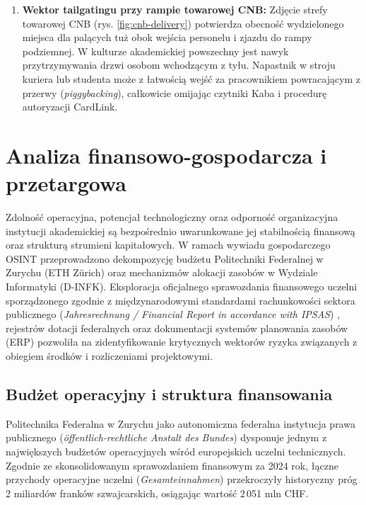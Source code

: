 \begin{enumerate}
    \item \textbf{Wektor tailgatingu przy rampie towarowej CNB:} Zdjęcie strefy towarowej CNB (rys. \ref{fig:cnb-delivery}) potwierdza obecność wydzielonego miejsca dla palących tuż obok wejścia personelu i zjazdu do rampy podziemnej. W kulturze akademickiej powszechny jest nawyk przytrzymywania drzwi osobom wchodzącym z tyłu. Napastnik w stroju kuriera lub studenta może z łatwością wejść za pracownikiem powracającym z przerwy (\textit{piggybacking}), całkowicie omijając czytniki Kaba i procedurę autoryzacji CardLink.
\end{enumerate}

\section{Analiza finansowo-gospodarcza i przetargowa}\label{sec:finanse-gospodarka}

Zdolność operacyjna, potencjał technologiczny oraz odporność organizacyjna instytucji akademickiej są bezpośrednio uwarunkowane jej stabilnością finansową oraz strukturą strumieni kapitałowych. W ramach wywiadu gospodarczego OSINT przeprowadzono dekompozycję budżetu Politechniki Federalnej w Zurychu (ETH Zürich) oraz mechanizmów alokacji zasobów w Wydziale Informatyki (D-INFK). Eksploracja oficjalnego sprawozdania finansowego uczelni sporządzonego zgodnie z międzynarodowymi standardami rachunkowości sektora publicznego (\textit{Jahresrechnung / Financial Report in accordance with IPSAS}) \cite{eth_financial_report_2024}, rejestrów dotacji federalnych oraz dokumentacji systemów planowania zasobów (ERP) pozwoliła na zidentyfikowanie krytycznych wektorów ryzyka związanych z obiegiem środków i rozliczeniami projektowymi.

\subsection{Budżet operacyjny i struktura finansowania}\label{subsec:budzet-sprawozdania}

Politechnika Federalna w Zurychu jako autonomiczna federalna instytucja prawa publicznego (\textit{öffentlich-rechtliche Anstalt des Bundes}) dysponuje jednym z największych budżetów operacyjnych wśród europejskich uczelni technicznych. Zgodnie ze skonsolidowanym sprawozdaniem finansowym za 2024 rok, łączne przychody operacyjne uczelni (\textit{Gesamteinnahmen}) przekroczyły historyczny próg 2 miliardów franków szwajcarskich, osiągając wartość 2\,051 mln CHF.

